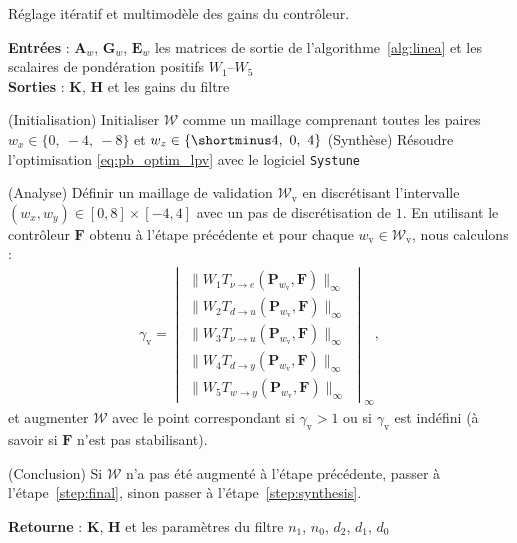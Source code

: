 \begin{algorithm}
  \caption{Réglage itératif et multimodèle des gains du contrôleur.}
  \label{alg:iterativeOptimisation}
  \hspace*{.1cm} \textbf{Entrées} : $\boldsymbol{A}_{w}$, $\boldsymbol{G}_{w}$, $\boldsymbol{E}_{w}$  les matrices de sortie de l'algorithme~\ref{alg:linea} et les scalaires de pondération positifs $W_1$--$W_5$\\
  \hspace*{.1cm} \textbf{Sorties} : $\boldsymbol{K}$, $\boldsymbol{H}$ et les gains du filtre
  \begin{algorithmic}[1]
   
    \State (Initialisation) Initialiser ${\mathcal W}$ comme un maillage comprenant toutes les paires $ w_{x} \in \{0,~-4,~-8\}$ et $ w_{z} \in \{\shortminus 4,~0,~4\}$
    \State \label{step:synthesis} (Synthèse) Résoudre l'optimisation \eqref{eq:pb_optim_lpv} avec le logiciel {\tt Systune}

    \State \label{step:analysis} (Analyse) Définir un maillage de validation ${\mathcal W}_{\text{v}}$ en discrétisant l'intervalle $(w_x,w_y) \in [0,8]\times[-4,4]$ avec un pas de discrétisation de $1$. En utilisant le contrôleur $\boldsymbol{F}$ obtenu à l'étape précédente et pour chaque $w_{\text{v}}\in {\mathcal W}_{\text{v}}$, nous calculons :
    \begin{align}
    \label{eq:validation_step}
    \gamma_{\text{v}} = \begin{vmatrix}
    \| W_{1} T_{\nu \rightarrow e}(\boldsymbol{P}_{w_{\text{v}}},\boldsymbol{F})\|_{\infty} \\
    \|W_{2} T_{d \rightarrow u}(\boldsymbol{P}_{w_{\text{v}}},\boldsymbol{F})\|_{\infty}\\
    \|W_{3} T_{\nu \rightarrow u}(\boldsymbol{P}_{w_{\text{v}}},\boldsymbol{F})\|_{\infty}\\
    \|W_{4} T_{d \rightarrow y}(\boldsymbol{P}_{w_{\text{v}}},\boldsymbol{F})\|_{\infty}\\
    \|W_{5} T_{w \rightarrow y}(\boldsymbol{P}_{w_{\text{v}}},\boldsymbol{F})\|_{\infty}
    \end{vmatrix}_{\infty} ,
    \end{align}
    et augmenter  ${\mathcal W}$ avec le point correspondant si $\gamma_{\text{v}} > 1$ ou si $\gamma_{\text{v}}$ est indéfini (à savoir si $\boldsymbol{F}$ n'est pas stabilisant).


    \State (Conclusion) Si ${\mathcal W}$ n'a pas été augmenté à l'étape précédente, passer à l'étape~\ref{step:final}, sinon passer à l'étape~\ref{step:synthesis}.
    
    \State \label{step:final} 
    \textbf{Retourne} : $\boldsymbol{K}$, $\boldsymbol{H}$ et les paramètres du filtre $n_1$, $n_0$,  $d_2$,  $d_1$,  $d_0$

  \end{algorithmic}
\end{algorithm}


